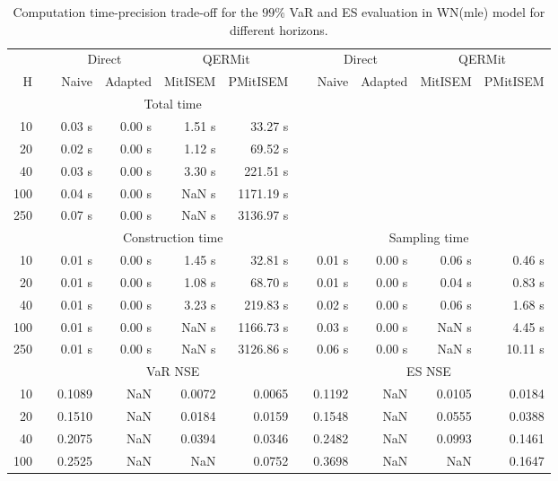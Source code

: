 { \renewcommand{\arraystretch}{1.3} 
\begin{table}[h] 
\centering 
\caption{Computation time-precision trade-off for the  $99\%$ VaR and ES evaluation in WN(mle) model for different horizons.} 
\label{tab:time_precision_WN_ML} 
\begin{tabular}{rr rrrr r rrrr}  
 & & \multicolumn{2}{c}{Direct} & \multicolumn{2}{c}{QERMit}&  & \multicolumn{2}{c}{Direct} & \multicolumn{2}{c}{QERMit} \\ \cline{3-6} \cline{8-11} 
 H & & Naive & Adapted & MitISEM & PMitISEM & & Naive & Adapted & MitISEM & PMitISEM \\ \hline 
 & & \multicolumn{4}{c}{Total time}  \\ \cline{3-6} 
10 & & 0.03 s & 0.00 s & 1.51 s & 33.27 s \\ 
20 & & 0.02 s & 0.00 s & 1.12 s & 69.52 s \\ 
40 & & 0.03 s & 0.00 s & 3.30 s & 221.51 s \\ 
100 & & 0.04 s & 0.00 s &  NaN s & 1171.19 s \\ 
250 & & 0.07 s & 0.00 s &  NaN s & 3136.97 s \\ 
\hline 
 & & \multicolumn{4}{c}{Construction time} & & \multicolumn{4}{c}{ Sampling time} \\ \cline{3-6}  \cline{8-11}
10 & & 0.01 s & 0.00 s & 1.45 s & 32.81 s && 0.01 s & 0.00 s & 0.06 s & 0.46 s \\ 
20 & & 0.01 s & 0.00 s & 1.08 s & 68.70 s && 0.01 s & 0.00 s & 0.04 s & 0.83 s \\ 
40 & & 0.01 s & 0.00 s & 3.23 s & 219.83 s && 0.02 s & 0.00 s & 0.06 s & 1.68 s \\ 
100 & & 0.01 s & 0.00 s &  NaN s & 1166.73 s && 0.03 s & 0.00 s &  NaN s & 4.45 s \\ 
250 & & 0.01 s & 0.00 s &  NaN s & 3126.86 s && 0.06 s & 0.00 s &  NaN s & 10.11 s \\ 
\hline 
 & & \multicolumn{4}{c}{VaR NSE} &&  \multicolumn{4}{c}{ES NSE} \\ \cline{3-6}  \cline{8-11}
10 && 0.1089  &    NaN  & 0.0072 & 0.0065 && 0.1192  &    NaN  & 0.0105 & 0.0184 \\ 
20 && 0.1510  &    NaN  & 0.0184 & 0.0159 && 0.1548  &    NaN  & 0.0555 & 0.0388 \\ 
40 && 0.2075  &    NaN  & 0.0394 & 0.0346 && 0.2482  &    NaN  & 0.0993 & 0.1461 \\ 
100 && 0.2525  &    NaN  &    NaN & 0.0752 && 0.3698  &    NaN  &    NaN & 0.1647 \\ 

\end{tabular}
\end{table}}
